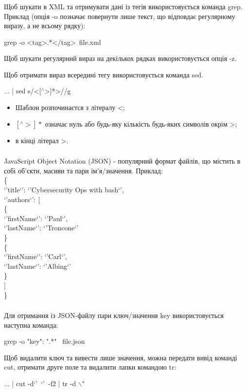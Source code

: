 \documentclass[t]{beamer}  %
\begin{document}
\begin{frame}
	\frametitle{\insertsection} 
	\framesubtitle{\insertsubsection}	
Щоб шукати в XML та отримувати дані із тегів використовується команда grep. Приклад (опція -o позначає повернути лише текст, що відповдає регулярному виразу, а не всьому рядку):

grep -o \textquotesingle<tag>.*</tag>\textquotesingle~file.xml

Щоб шукати регулярний вираз на декількох рядках використовується опція -z.

Щоб отримати вираз всередині тегу використовується команда sed.

... | sed \textquotesingle s/<[${}^{\wedge}$>]*>//g\textquotesingle
\begin{itemize}
  \item Шаблон розпочинаєтся з літералу <;
  \item $[{}^{\wedge}>]*$ означає нуль або будь-яку кількість будь-яких символів окрім >;  
  \item в кінці літерал >. 
\end{itemize}
\end{frame}

\begin{frame}
	\frametitle{\insertsection} 
	\framesubtitle{\insertsubsection}	
JavaScript Object Notation (JSON) - популярний формат файлів, що містить в собі об'єкти, масиви та пари ім'я/значення. Приклад:\\
\{\\
\quad`'title`': `'Cybersecurity Ops with bash`',\\
\quad`'authors`': [\\
\quad\quad\{\\
\quad\quad`'firstName`': `'Paul`',\\
\quad\quad`'lastName`': `'Troncone`'\\
\quad\quad\}\\
\quad\quad\{\\
\quad\quad`'firstName`': `'Carl`',\\
\quad\quad`'lastName`': `'Albing`'\\
\quad\quad\}\\
\quad]\\
\}
\end{frame}

\begin{frame}
	\frametitle{\insertsection} 
	\framesubtitle{\insertsubsection}	
Для отримання із JSON-файлу пари ключ/значення key використовується наступна команда:

grep -o \textquotesingle "key": ".*" \textquotesingle~file.json

Щоб видалити ключ та вивести лише значення, можна передати вивід команді cut, отримати друге поле та видалити лапки командою tr:

... | cut -d`'~`'~-f2  | tr -d \textquotesingle  $\backslash$" \textquotesingle  
\end{frame}
\end{document}
